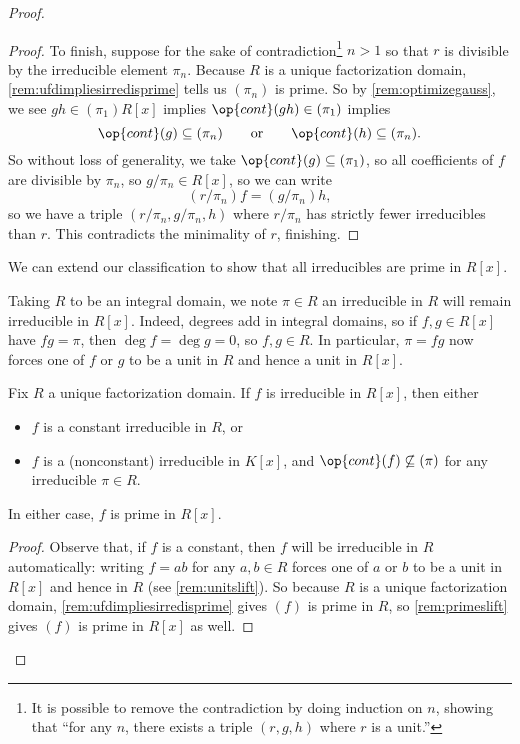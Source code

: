 \begin{proof}
\begin{proof}
		To finish, suppose for the sake of contradiction\footnote{It is possible to remove the contradiction by doing induction on $n$, showing that ``for any $n$, there exists a triple $(r,g,h)$ where $r$ is a unit.''} $n>1$ so that $r$ is divisible by the irreducible element $\pi_n$. Because $R$ is a unique factorization domain, \autoref{rem:ufdimpliesirredisprime} tells us $(\pi_n)$ is prime. So by \autoref{rem:optimizegauss}, we see $gh\in(\pi_1)R[x]$ implies $\op{cont}(gh)\in(\pi_1)$ implies
		\[\op{cont}(g)\subseteq(\pi_n)\qquad\text{or}\qquad\op{cont}(h)\subseteq(\pi_n).\]
		So without loss of generality, we take $\op{cont}(g)\subseteq(\pi_1)$, so all coefficients of $f$ are divisible by $\pi_n$, so $g/\pi_n\in R[x]$, so we can write
		\[(r/\pi_n)f=(g/\pi_n)h,\]
		so we have a triple $(r/\pi_n,g/\pi_n,h)$ where $r/\pi_n$ has strictly fewer irreducibles than $r$. This contradicts the minimality of $r$, finishing.
	\end{proof}
	We can extend our classification to show that all irreducibles are prime in $R[x]$.
	\begin{remark}[Nir] \label{rem:irredslift}
		Taking $R$ to be an integral domain, we note $\pi\in R$ an irreducible in $R$ will remain irreducible in $R[x]$. Indeed, degrees add in integral domains, so if $f,g\in R[x]$ have $fg=\pi$, then $\deg f=\deg g=0$, so $f,g\in R$. In particular, $\pi=fg$ now forces one of $f$ or $g$ to be a unit in $R$ and hence a unit in $R[x]$.
	\end{remark}
	\begin{lemma} \label{lem:classifyirreds}
		Fix $R$ a unique factorization domain. If $f$ is irreducible in $R[x]$, then either
		\begin{itemize}
			\item $f$ is a constant irreducible in $R$, or
			\item $f$ is a (nonconstant) irreducible in $K[x]$, and $\op{cont}(f)\not\subseteq(\pi)$ for any irreducible $\pi\in R$.
		\end{itemize}
		In either case, $f$ is prime in $R[x]$.
	\end{lemma}
	\begin{proof}
		Observe that, if $f$ is a constant, then $f$ will be irreducible in $R$ automatically: writing $f=ab$ for any $a,b\in R$ forces one of $a$ or $b$ to be a unit in $R[x]$ and hence in $R$ (see \autoref{rem:unitslift}). So because $R$ is a unique factorization domain, \autoref{rem:ufdimpliesirredisprime} gives $(f)$ is prime in $R$, so \autoref{rem:primeslift} gives $(f)$ is prime in $R[x]$ as well.


\end{proof}
\end{proof}
